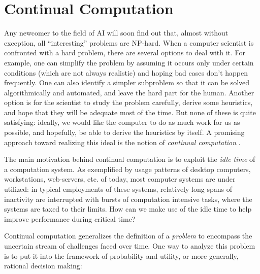 \documentclass{llncs}
\begin{document}
\section{Continual Computation\label{continual}}

Any newcomer to the field of AI will soon find out that, almost without
exception, all {}``interesting'' problems are NP-hard.  When a computer
scientist is confronted with a hard problem, there are several options to
deal with it.  For example, one can simplify the problem by assuming it
occurs only under certain conditions (which are not always realistic) and
hoping bad cases don't happen frequently.  One can also identify a simpler
subproblem so that it can be solved algorithmically and automated, and
leave the hard part for the human.  Another option is for the scientist to
study the problem carefully, derive some heuristics, and hope that they
will be adequate most of the time.  But none of these is quite satisfying:
ideally, we would like the computer to do as much work for us as possible,
and hopefully, be able to derive the heuristics by itself.  A promising
approach toward realizing this ideal is the notion of \emph{continual
  computation} \cite{horvitz1997:models_continual}.

The main motivation behind continual computation is to exploit the
\emph{idle time} of a computation system.  As exemplified by usage patterns
of desktop computers, workstations, web-servers, etc. of today, most
computer systems are under utilized: in typical employments of these
systems, relatively long spans of inactivity are interrupted with bursts of
computation intensive tasks, where the systems are taxed to their limits.
How can we make use of the idle time to help improve performance during
critical time?

Continual computation generalizes the definition of a \emph{problem} to
encompass the uncertain stream of challenges faced over time.  One way to
analyze this problem is to put it into the framework of probability and
utility, or more generally, rational decision making:
\end{document}
